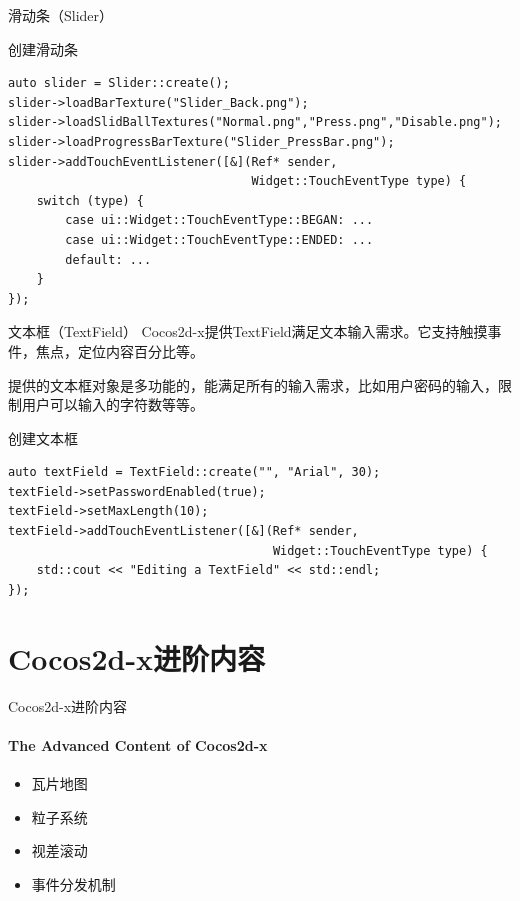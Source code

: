 \documentclass{beamer}
\begin{document}

\begin{frame}[fragile]{滑动条（Slider）}
\begin{block}{创建滑动条}
\begin{verbatim}
auto slider = Slider::create();
slider->loadBarTexture("Slider_Back.png");
slider->loadSlidBallTextures("Normal.png","Press.png","Disable.png");
slider->loadProgressBarTexture("Slider_PressBar.png");
slider->addTouchEventListener([&](Ref* sender,
                                  Widget::TouchEventType type) {
    switch (type) {
        case ui::Widget::TouchEventType::BEGAN: ...
        case ui::Widget::TouchEventType::ENDED: ...
        default: ...
    }
});
\end{verbatim}
\end{block}
\end{frame}


\begin{frame}[fragile]{文本框（TextField）}
Cocos2d-x提供TextField满足文本输入需求。它支持触摸事件，焦点，定位内容百分比等。

\vspace{1em}

提供的文本框对象是多功能的，能满足所有的输入需求，比如用户密码的输入，限制用户可以输入的字符数等等。

\begin{block}{创建文本框}
\begin{verbatim}
auto textField = TextField::create("", "Arial", 30);
textField->setPasswordEnabled(true);
textField->setMaxLength(10);
textField->addTouchEventListener([&](Ref* sender,
                                     Widget::TouchEventType type) {
    std::cout << "Editing a TextField" << std::endl;
});
\end{verbatim}
\end{block}
\end{frame}


\section{Cocos2d-x进阶内容}


\begin{chapter}{}{Cocos2d-x进阶内容}
\framesubtitle{The Advanced Content of Cocos2d-x}
\begin{itemize}
\item 瓦片地图
\item 粒子系统
\item 视差滚动
\item 事件分发机制
\end{itemize}
\end{chapter}
\end{document}
